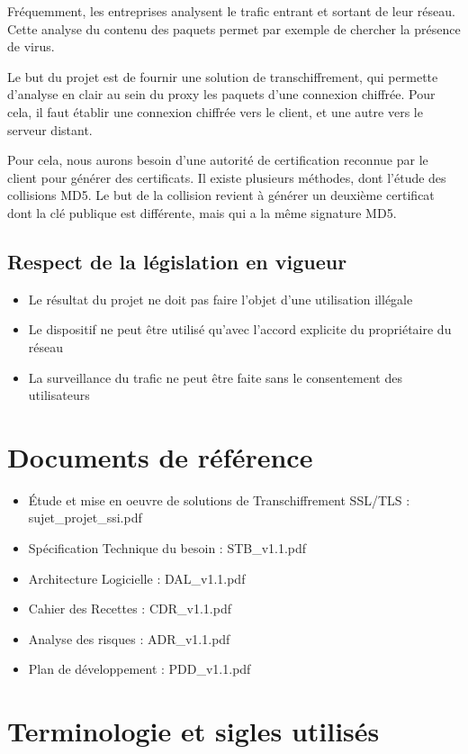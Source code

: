 \documentclass[a4paper,11pt,french]{article}
\begin{document}
Fréquemment, les entreprises analysent le trafic entrant et sortant de leur réseau. Cette analyse du contenu des paquets permet par exemple de chercher la présence de virus.


Le but du projet est de fournir une solution de transchiffrement, qui permette d'analyse en clair au sein du proxy les paquets d'une connexion chiffrée. Pour cela, il faut établir une connexion chiffrée vers le client, et une autre vers le serveur distant.


Pour cela, nous aurons besoin d'une autorité de certification reconnue par le client pour générer des certificats.
Il existe plusieurs méthodes, dont l'étude des collisions MD5.
Le but de la collision revient à générer un deuxième certificat dont la clé publique est différente, mais qui a la même signature MD5.


\subsection{Respect de la législation en vigueur}
\begin{itemize}

\item Le résultat du projet ne doit pas faire l'objet d'une utilisation illégale
\item Le dispositif ne peut être utilisé qu'avec l'accord explicite du propriétaire du réseau
\item La surveillance du trafic ne peut être faite sans le consentement des utilisateurs
\end{itemize}
\newpage
\section{Documents de référence}

\begin{itemize}
\item Étude et mise en oeuvre de solutions de Transchiffrement SSL/TLS : sujet\_projet\_ssi.pdf
\item Spécification Technique du besoin : STB\_v1.1.pdf
\item Architecture Logicielle : DAL\_v1.1.pdf
\item Cahier des Recettes : CDR\_v1.1.pdf
\item Analyse des risques : ADR\_v1.1.pdf
\item Plan de développement : PDD\_v1.1.pdf
\end{itemize}

\newpage
\section{Terminologie et sigles utilisés}
\end{document}
